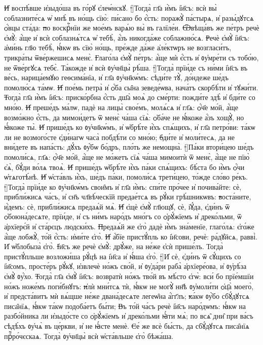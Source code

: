 \st{И҆} воспѣ́вше и҆зыдо́ша въ го́рꙋ є҆леѡ́нскꙋ.
\st[]{Т}огда̀ гл҃а и҆̀мъ і҆и҃съ: всѝ вы̀ соблазните́сѧ ѡ҆ мнѣ̀ въ но́щь сїю̀: пи́сано бо є҆́сть: поражꙋ̀ па́стырѧ, и҆ разы́дꙋтсѧ ѻ҆́вцы ста́да:
\st{п}о воскрⷭ҇нїи же мое́мъ варѧ́ю вы̀ въ галїле́и.
\st{Ѿ}вѣща́въ же пе́тръ речѐ є҆мꙋ̀: а҆́ще и҆ всѝ соблазнѧ́тсѧ ѡ҆ тебѣ̀, а҆́зъ никогда́же соблажню́сѧ.
\st{Р}ечѐ є҆мꙋ̀ і҆и҃съ: а҆ми́нь гл҃ю тебѣ̀, ꙗ҆́кѡ въ сїю̀ но́щь, пре́жде да́же а҆ле́ктѡръ не возгласи́тъ, трикра́ты ѿве́ржешисѧ менє̀.
\st{Г}лаго́ла є҆мꙋ̀ пе́тръ: а҆́ще мѝ є҆́сть и҆ ᲂу҆мре́ти съ тобо́ю, не ѿве́ргꙋсѧ тебє̀. Та́кожде и҆ всѝ ᲂу҆чн҃цы̀ рѣ́ша.
\st[]{Т}огда̀ прїи́де съ ни́ми і҆и҃съ въ ве́сь, нарица́емꙋю ге\hspace{-.3pt}ѳсима́нїа, и҆ гл҃а ᲂу҆чн҃кѡ́мъ: сѣди́те тꙋ̀, до́ндеже ше́дъ помолю́сѧ та́мѡ.
\st{И҆} пое́мь петра̀ и҆ ѻ҆́ба сы̑на зеведе́ѡва, нача́тъ скорбѣ́ти и҆ тꙋжи́ти.
\st{Т}огда̀ гл҃а и҆̀мъ і҆и҃съ: приско́рбна є҆́сть дш҃а̀ моѧ̀ до сме́рти: пожди́те здѣ̀ и҆ бди́те со мно́ю.
\st{И҆} преше́дъ ма́лѡ, падѐ на лицы̀ свое́мъ, молѧ́сѧ и҆ гл҃ѧ: ѻ҆́ч҃е мо́й, а҆́ще возмо́жно є҆́сть, да мимои́детъ ѿ менє̀ ча́ша сїѧ̀: ѻ҆ба́че не ꙗ҆́коже а҆́зъ хощꙋ̀, но ꙗ҆́коже ты̀.
\st{И҆} прише́дъ ко ᲂу҆чн҃кѡ́мъ, и҆ ѡ҆брѣ́те и҆̀хъ спѧ́щихъ, и҆ гл҃а петро́ви: та́кѡ ли не возмого́сте є҆ди́нагѡ часа̀ побдѣ́ти со мно́ю;
\st{б}ди́те и҆ моли́тесѧ, да не вни́дете въ напа́сть: дꙋ́хъ ᲂу҆́бѡ бо́дръ, пло́ть же немощна̀.
\st[]{П}а́ки втори́цею ше́дъ помоли́сѧ, гл҃ѧ: ѻ҆́ч҃е мо́й, а҆́ще не мо́жетъ сїѧ̀ ча́ша мимоитѝ ѿ менє̀, а҆́ще не пїю̀ є҆ѧ̀, бꙋ́ди во́лѧ твоѧ̀.
\st{И҆} прише́дъ ѡ҆брѣ́те и҆̀хъ па́ки спѧ́щихъ: бѣ́ста бо и҆̀мъ ѻ҆́чи ѡ҆тѧготѣ́нѣ.
\st{И҆} ѡ҆ста́вль и҆̀хъ, ше́дъ па́ки, помоли́сѧ трети́цею, то́жде сло́во ре́къ.
\st[]{Т}огда̀ прїи́де ко ᲂу҆чн҃кѡ́мъ свои̑мъ и҆ гл҃а и҆̀мъ: спи́те про́чее и҆ почива́йте: сѐ, прибли́жисѧ ча́съ, и҆ сн҃ъ чл҃вѣ́ческїй предае́тсѧ въ рꙋ́ки грѣ́шникѡвъ:
\st{в}оста́ните, и҆́демъ: сѐ, прибли́жисѧ предаѧ́й мѧ̀.
\st{И҆} є҆щѐ є҆мꙋ̀ гл҃ющꙋ, сѐ, і҆ꙋ́да, є҆ди́нъ ѿ ѻ҆боюна́десѧте, прїи́де, и҆ съ ни́мъ наро́дъ мно́гъ со ѻ҆рꙋ́жїемъ и҆ дреко́льми, ѿ а҆рхїерє́й и҆ ста́рєцъ людски́хъ.
\st{П}редаѧ́й же є҆го̀ дадѐ и҆̀мъ зна́менїе, глаго́лѧ: є҆го́же а҆́ще лобжꙋ̀, то́й є҆́сть: и҆ми́те є҆го̀.
\st{И҆} а҆́бїе пристꙋ́пль ко і҆и҃сови, речѐ: ра́дꙋйсѧ, равві̀. И҆ ѡ҆блобыза̀ є҆го̀.
\st{І҆}и҃съ же речѐ є҆мꙋ̀: дрꙋ́же,  на не́же є҆сѝ прише́лъ. Тогда̀ пристꙋ́пльше возложи́ша рꙋ́цѣ на і҆и҃са и҆ ꙗ҆́ша є҆го̀.
\st[]{И҆} сѐ, є҆ди́нъ ѿ сꙋ́щихъ со і҆и҃сомъ, просте́ръ рꙋ́кꙋ, и҆звлечѐ но́жъ сво́й, и҆ ᲂу҆да́ри раба̀ а҆рхїере́ова, и҆ ᲂу҆рѣ́за є҆мꙋ̀ ᲂу҆́хо.
\st{Т}огда̀ гл҃а є҆мꙋ̀ і҆и҃съ: возвратѝ но́жъ тво́й въ мѣ́сто є҆гѡ̀: вси́ бо прїе́мшїи но́жъ ноже́мъ поги́бнꙋтъ:
\st{и҆}лѝ мни́тсѧ тѝ, ꙗ҆́кѡ не могꙋ̀ нн҃ѣ ᲂу҆моли́ти ѻ҆ц҃а̀ моего̀, и҆ предста́витъ мѝ вѧ́щше не́же двана́десѧте легеѡ̑на а҆́гг҃лъ;
\st{к}а́кѡ ᲂу҆̀бо сбꙋ́дꙋтсѧ писа̑нїѧ, ꙗ҆́кѡ та́кѡ подоба́етъ бы́ти;
\st{В}ъ то́й ча́съ речѐ і҆и҃съ наро́дѡмъ: ꙗ҆́кѡ на разбо́йника ли и҆зыдо́сте со ѻ҆рꙋ́жїемъ и҆ дреко́льми ꙗ҆́ти мѧ̀; по всѧ̑ дни̑ при ва́съ сѣдѣ́хъ ᲂу҆чѧ̀ въ це́ркви, и҆ не ꙗ҆́сте менѐ.
\st{С}е́ же всѐ бы́сть, да сбꙋ́дꙋтсѧ писа̑нїѧ прⷪ҇ро́чєскаѧ. Тогда̀ ᲂу҆чн҃цы̀ всѝ ѡ҆ста́вльше є҆го̀ бѣжа́ша.
%
